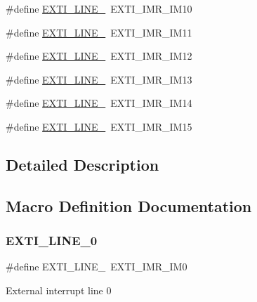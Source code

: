 \begin{DoxyCompactItemize}
\item 
\#define \mbox{\hyperlink{group___e_x_t_i___line_gac94dbc4ff94b573f4dd796d60dcd250c}{E\+X\+T\+I\+\_\+\+L\+I\+N\+E\+\_}}~E\+X\+T\+I\+\_\+\+I\+M\+R\+\_\+\+I\+M10
\item 
\#define \mbox{\hyperlink{group___e_x_t_i___line_ga301648b2965852f535209429f71e251b}{E\+X\+T\+I\+\_\+\+L\+I\+N\+E\+\_}}~E\+X\+T\+I\+\_\+\+I\+M\+R\+\_\+\+I\+M11
\item 
\#define \mbox{\hyperlink{group___e_x_t_i___line_ga4ff15c98aec7cd3fd0f0c5bd5cfaa501}{E\+X\+T\+I\+\_\+\+L\+I\+N\+E\+\_}}~E\+X\+T\+I\+\_\+\+I\+M\+R\+\_\+\+I\+M12
\item 
\#define \mbox{\hyperlink{group___e_x_t_i___line_ga8e144f1beae1e5d259f5d4aed6a3efe0}{E\+X\+T\+I\+\_\+\+L\+I\+N\+E\+\_}}~E\+X\+T\+I\+\_\+\+I\+M\+R\+\_\+\+I\+M13
\item 
\#define \mbox{\hyperlink{group___e_x_t_i___line_ga60b812a0a6fe00af8db8763b8202a463}{E\+X\+T\+I\+\_\+\+L\+I\+N\+E\+\_}}~E\+X\+T\+I\+\_\+\+I\+M\+R\+\_\+\+I\+M14
\item 
\#define \mbox{\hyperlink{group___e_x_t_i___line_ga9e711303de4e32d120d2551dc5c64dd7}{E\+X\+T\+I\+\_\+\+L\+I\+N\+E\+\_}}~E\+X\+T\+I\+\_\+\+I\+M\+R\+\_\+\+I\+M15
\end{DoxyCompactItemize}


\subsection{Detailed Description}


\subsection{Macro Definition Documentation}
\mbox{\label{group___e_x_t_i___line_gac1a9cd58d76e9f497abecc832e3294c8}} 
\subsubsection{\texorpdfstring{EXTI\_LINE\_0}{EXTI\_LINE\_0}}
{\footnotesize\ttfamily \#define E\+X\+T\+I\+\_\+\+L\+I\+N\+E\+\_~E\+X\+T\+I\+\_\+\+I\+M\+R\+\_\+\+I\+M0}

External interrupt line 0 \mbox{\label{group___e_x_t_i___line_gaf64b8deca0cf44b4c58d2b4d0fcd2177}} 

